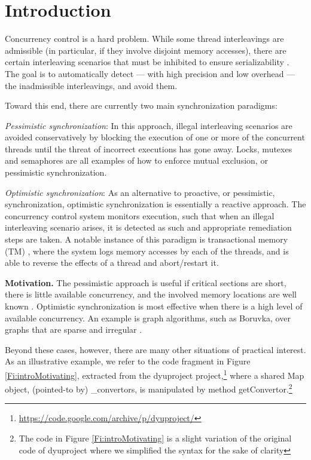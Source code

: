 \section{Introduction}\label{Se:intro}

Concurrency control is a hard problem. While some thread interleavings are admissible (in particular, if they involve disjoint memory accesses), there are certain interleaving scenarios that must be inhibited to ensure serializability \cite{Serializability}. The goal is to automatically detect --- with high precision and low overhead --- the inadmissible interleavings, and avoid them.  

Toward this end, there are currently two main synchronization paradigms:
\begin{compactitem}
	\item \textit{Pessimistic synchronization}: In this approach, illegal interleaving scenarios are avoided conservatively by blocking the execution of one or more of the concurrent threads until the threat of incorrect executions has gone away. Locks, mutexes and semaphores are all examples of how to enforce mutual exclusion, or pessimistic synchronization.
	\item \textit{Optimistic synchronization}: As an alternative to proactive, or pessimistic, synchronization, optimistic synchronization is essentially a reactive approach. The concurrency control system monitors execution, such that when an illegal interleaving scenario arises, it is detected as such and appropriate remediation steps are taken. A notable instance of this paradigm is transactional memory (TM) \cite{DBLP:conf/isca/HerlihyM93}, where the system logs memory accesses by each of the threads, and is able to reverse the effects of a thread and abort/restart it.
\end{compactitem}

\noindent \textbf{Motivation.} The pessimistic approach is useful if critical sections are short, there is little available concurrency, and the involved memory locations are well known \cite{AndiKleen}. Optimistic synchronization is most effective when there is a high level of available concurrency. An example is graph algorithms, such as Boruvka, over graphs that are sparse and irregular \cite{KulkarniGalois}.

Beyond these cases, however, there are many other situations of practical interest. As an illustrative example, we refer to the code fragment in Figure \ref{Fi:introMotivating}, extracted from the {\sf dyuproject} project,\footnote{\url{https://code.google.com/archive/p/dyuproject/}} where a shared {\sf Map} object, (pointed-to by) {\sf \_convertors}, is manipulated by method {\sf getConvertor}.\footnote{The code in Figure \ref{Fi:introMotivating} is a slight variation of the original code of {\sf dyuproject} where we simplified the syntax for the sake of clarity}

